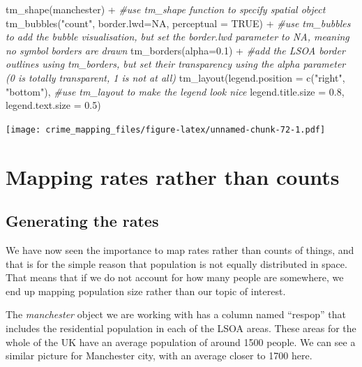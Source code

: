 \documentclass[
]{book}
\newenvironment{Shaded}{\begin{snugshade}}{\end{snugshade}}
\newcommand{\AttributeTok}[1]{\textcolor[rgb]{0.77,0.63,0.00}{#1}}
\newcommand{\CommentTok}[1]{\textcolor[rgb]{0.56,0.35,0.01}{\textit{#1}}}
\newcommand{\ConstantTok}[1]{\textcolor[rgb]{0.00,0.00,0.00}{#1}}
\newcommand{\FloatTok}[1]{\textcolor[rgb]{0.00,0.00,0.81}{#1}}
\newcommand{\FunctionTok}[1]{\textcolor[rgb]{0.00,0.00,0.00}{#1}}
\newcommand{\NormalTok}[1]{#1}
\newcommand{\SpecialCharTok}[1]{\textcolor[rgb]{0.00,0.00,0.00}{#1}}
\newcommand{\StringTok}[1]{\textcolor[rgb]{0.31,0.60,0.02}{#1}}
\begin{document}
\begin{Shaded}
\begin{Highlighting}[]
\FunctionTok{tm\_shape}\NormalTok{(manchester) }\SpecialCharTok{+}                         \CommentTok{\#use tm\_shape function to specify spatial object}
  \FunctionTok{tm\_bubbles}\NormalTok{(}\StringTok{"count"}\NormalTok{, }\AttributeTok{border.lwd=}\ConstantTok{NA}\NormalTok{, }\AttributeTok{perceptual =} \ConstantTok{TRUE}\NormalTok{) }\SpecialCharTok{+}              \CommentTok{\#use tm\_bubbles to add the bubble visualisation, but set the \textquotesingle{}border.lwd\textquotesingle{} parameter to NA, meaning no symbol borders are drawn}
  \FunctionTok{tm\_borders}\NormalTok{(}\AttributeTok{alpha=}\FloatTok{0.1}\NormalTok{) }\SpecialCharTok{+}                           \CommentTok{\#add the LSOA border outlines using tm\_borders, but set their transparency using the alpha parameter (0 is totally transparent, 1 is not at all)}
  \FunctionTok{tm\_layout}\NormalTok{(}\AttributeTok{legend.position =} \FunctionTok{c}\NormalTok{(}\StringTok{"right"}\NormalTok{, }\StringTok{"bottom"}\NormalTok{), }\CommentTok{\#use tm\_layout to make the legend look nice}
            \AttributeTok{legend.title.size =} \FloatTok{0.8}\NormalTok{,}
            \AttributeTok{legend.text.size =} \FloatTok{0.5}\NormalTok{)}
\end{Highlighting}
\end{Shaded}

\texttt{[image: crime\_mapping\_files/figure-latex/unnamed-chunk-72-1.pdf]}

\hypertarget{mapping-rates-rather-than-counts}{%
\section{Mapping rates rather than counts}\label{mapping-rates-rather-than-counts}}

\hypertarget{generating-the-rates}{%
\subsection{Generating the rates}\label{generating-the-rates}}

We have now seen the importance to map rates rather than counts of things, and that is for the simple reason that population is not equally distributed in space. That means that if we do not account for how many people are somewhere, we end up mapping population size rather than our topic of interest.

The \emph{manchester} object we are working with has a column named ``respop'' that includes the residential population in each of the LSOA areas. These areas for the whole of the UK have an average population of around 1500 people. We can see a similar picture for Manchester city, with an average closer to 1700 here.
\end{document}
